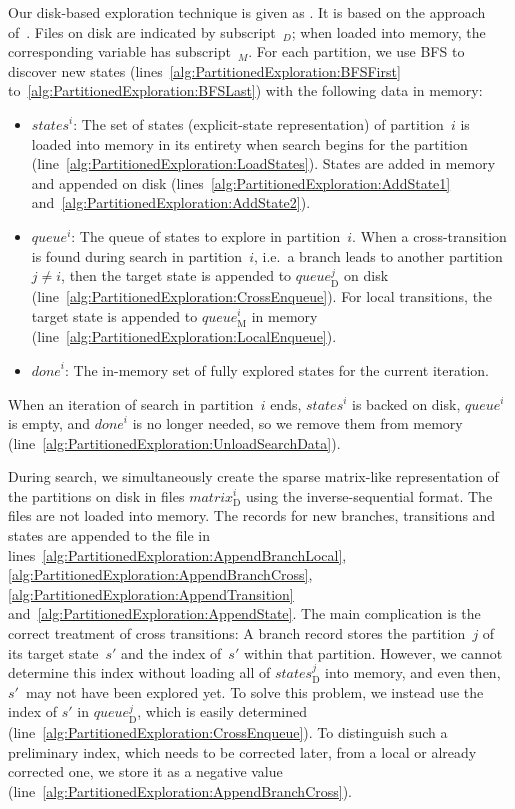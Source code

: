 \documentclass{llncs}
\newcommand{\ie}{i.e.\ }
\begin{document}
Our disk-based exploration technique is given as .
It is based on the approach of~\cite{BJ05,EK13}.
Files on disk are indicated by subscript~$_D$; when loaded into memory, the corresponding variable has subscript~$_M$.
For each partition, we use BFS to discover new states (lines~\ref{alg:PartitionedExploration:BFSFirst} to~\ref{alg:PartitionedExploration:BFSLast}) with the following data in memory:
\begin{itemize}
\item $\mathit{states}^i$:
The set of states (explicit-state representation) of partition~$i$ is loaded into memory in its entirety when search begins for the partition (line~\ref{alg:PartitionedExploration:LoadStates}).
States are added in memory and appended on disk (lines~\ref{alg:PartitionedExploration:AddState1} and~\ref{alg:PartitionedExploration:AddState2}).
\item $\mathit{queue}^i$:
The queue of states to explore in partition~$i$.
When a cross-transition is found during search in partition~$i$, \ie a branch leads to another partition $j \neq i$, then the target state is appended to $\mathit{queue}_\mathrm{D}^j$ on disk (line~\ref{alg:PartitionedExploration:CrossEnqueue}).
For local transitions, the target state is appended to $\mathit{queue}_\mathrm{M}^i$ in memory (line~\ref{alg:PartitionedExploration:LocalEnqueue}).
\item $\mathit{done}^i$:
The in-memory set of fully explored states for the current iteration.
\end{itemize}
When an iteration of search in partition~$i$ ends, $\mathit{states}^i$ is backed on disk, $\mathit{queue}^i$ is empty, and $\mathit{done}^i$ is no longer needed, so we remove them from memory (line~\ref{alg:PartitionedExploration:UnloadSearchData}).

During search, we simultaneously create the sparse matrix-like representation of the partitions on disk in files $\mathit{matrix}_\mathrm{D}^i$ using the inverse-sequential format.
The files are not loaded into memory.
The records for new branches, transitions and states are appended to the file in lines~\ref{alg:PartitionedExploration:AppendBranchLocal}, \ref{alg:PartitionedExploration:AppendBranchCross}, \ref{alg:PartitionedExploration:AppendTransition} and~\ref{alg:PartitionedExploration:AppendState}.
The main complication is the correct treatment of cross transitions:
A branch record stores the partition~$j$ of its target state~$s'$ and the index of~$s'$ within that partition.
However, we cannot determine this index without loading all of $\mathit{states}_\mathrm{D}^j$ into memory, and even then, $s'$~may not have been explored yet.
To solve this problem, we instead use the index of $s'$ in $\mathit{queue}_\mathrm{D}^j$, which is easily determined (line~\ref{alg:PartitionedExploration:CrossEnqueue}).
To distinguish such a preliminary index, which needs to be corrected later, from a local or already corrected one, we store it as a negative value (line~\ref{alg:PartitionedExploration:AppendBranchCross}).
\end{document}
